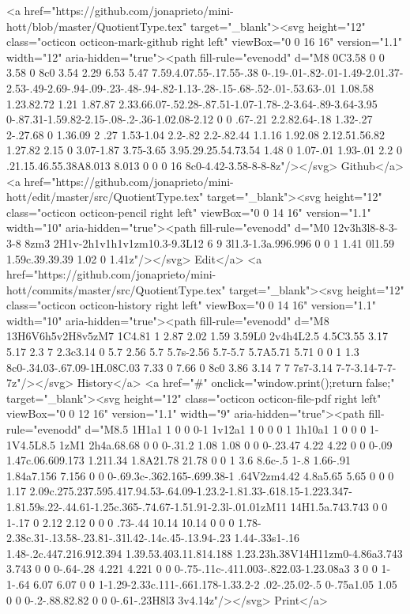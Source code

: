       <a href="https://github.com/jonaprieto/mini-hott/blob/master/QuotientType.tex" target="_blank"><svg height="12" class="octicon octicon-mark-github right left" viewBox="0 0 16 16" version="1.1" width="12" aria-hidden="true"><path fill-rule="evenodd" d="M8 0C3.58 0 0 3.58 0 8c0 3.54 2.29 6.53 5.47 7.59.4.07.55-.17.55-.38 0-.19-.01-.82-.01-1.49-2.01.37-2.53-.49-2.69-.94-.09-.23-.48-.94-.82-1.13-.28-.15-.68-.52-.01-.53.63-.01 1.08.58 1.23.82.72 1.21 1.87.87 2.33.66.07-.52.28-.87.51-1.07-1.78-.2-3.64-.89-3.64-3.95 0-.87.31-1.59.82-2.15-.08-.2-.36-1.02.08-2.12 0 0 .67-.21 2.2.82.64-.18 1.32-.27 2-.27.68 0 1.36.09 2 .27 1.53-1.04 2.2-.82 2.2-.82.44 1.1.16 1.92.08 2.12.51.56.82 1.27.82 2.15 0 3.07-1.87 3.75-3.65 3.95.29.25.54.73.54 1.48 0 1.07-.01 1.93-.01 2.2 0 .21.15.46.55.38A8.013 8.013 0 0 0 16 8c0-4.42-3.58-8-8-8z"/></svg> Github</a>
      <a href="https://github.com/jonaprieto/mini-hott/edit/master/src/QuotientType.tex" target="_blank"><svg height="12" class="octicon octicon-pencil right left" viewBox="0 0 14 16" version="1.1" width="10" aria-hidden="true"><path fill-rule="evenodd" d="M0 12v3h3l8-8-3-3-8 8zm3 2H1v-2h1v1h1v1zm10.3-9.3L12 6 9 3l1.3-1.3a.996.996 0 0 1 1.41 0l1.59 1.59c.39.39.39 1.02 0 1.41z"/></svg> Edit</a>
      <a href="https://github.com/jonaprieto/mini-hott/commits/master/src/QuotientType.tex" target="_blank"><svg height="12" class="octicon octicon-history right left" viewBox="0 0 14 16" version="1.1" width="10" aria-hidden="true"><path fill-rule="evenodd" d="M8 13H6V6h5v2H8v5zM7 1C4.81 1 2.87 2.02 1.59 3.59L0 2v4h4L2.5 4.5C3.55 3.17 5.17 2.3 7 2.3c3.14 0 5.7 2.56 5.7 5.7s-2.56 5.7-5.7 5.7A5.71 5.71 0 0 1 1.3 8c0-.34.03-.67.09-1H.08C.03 7.33 0 7.66 0 8c0 3.86 3.14 7 7 7s7-3.14 7-7-3.14-7-7-7z"/></svg> History</a>
      <a  href="#" onclick="window.print();return false;" target="_blank"><svg height="12" class="octicon octicon-file-pdf right left" viewBox="0 0 12 16" version="1.1" width="9" aria-hidden="true"><path fill-rule="evenodd" d="M8.5 1H1a1 1 0 0 0-1 1v12a1 1 0 0 0 1 1h10a1 1 0 0 0 1-1V4.5L8.5 1zM1 2h4a.68.68 0 0 0-.31.2 1.08 1.08 0 0 0-.23.47 4.22 4.22 0 0 0-.09 1.47c.06.609.173 1.211.34 1.8A21.78 21.78 0 0 1 3.6 8.6c-.5 1-.8 1.66-.91 1.84a7.156 7.156 0 0 0-.69.3c-.362.165-.699.38-1 .64V2zm4.42 4.8a5.65 5.65 0 0 0 1.17 2.09c.275.237.595.417.94.53-.64.09-1.23.2-1.81.33-.618.15-1.223.347-1.81.59s.22-.44.61-1.25c.365-.74.67-1.51.91-2.3l-.01.01zM11 14H1.5a.743.743 0 0 1-.17 0 2.12 2.12 0 0 0 .73-.44 10.14 10.14 0 0 0 1.78-2.38c.31-.13.58-.23.81-.31l.42-.14c.45-.13.94-.23 1.44-.33s1-.16 1.48-.2c.447.216.912.394 1.39.53.403.11.814.188 1.23.23h.38V14H11zm0-4.86a3.743 3.743 0 0 0-.64-.28 4.221 4.221 0 0 0-.75-.11c-.411.003-.822.03-1.23.08a3 3 0 0 1-1-.64 6.07 6.07 0 0 1-1.29-2.33c.111-.661.178-1.33.2-2 .02-.25.02-.5 0-.75a1.05 1.05 0 0 0-.2-.88.82.82 0 0 0-.61-.23H8l3 3v4.14z"/></svg> Print</a>
